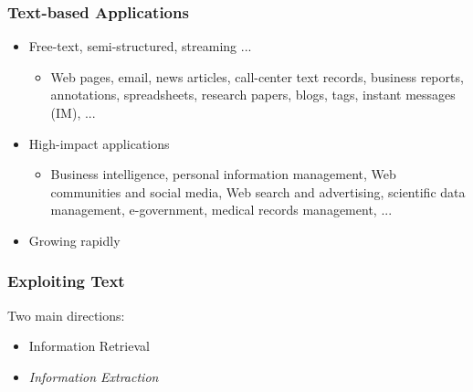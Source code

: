 \documentclass{beamer}
\begin{document}
\begin{frame}
  \frametitle{Text-based Applications}
  \begin{itemize}
  \item Free-text, semi-structured, streaming ...
      \begin{itemize}
      \item Web pages, email, news articles, call-center text records, business
          reports, annotations, spreadsheets, research papers, blogs, tags,
          instant messages (IM), ...
      \end{itemize}
  \item High-impact applications
      \begin{itemize}
      \item Business intelligence, personal information management, Web
          communities and social media, Web search and advertising, scientific data management,
          e-government, medical records management, ...
      \end{itemize}
  \item Growing rapidly
  \end{itemize}
\end{frame}

\begin{frame}
  \frametitle{Exploiting Text}
  Two main directions:
  \begin{itemize}
  \item Information Retrieval
  \item \emph{Information Extraction}
  \end{itemize}
\end{frame}

\newcommand{\job}[1]{\textcolor<4->{red}{#1}}
\newcommand{\artist}[1]{\textcolor<2->{green}{#1}}
\newcommand{\band}[1]{\textcolor<3->{blue}{#1}}
\end{document}
